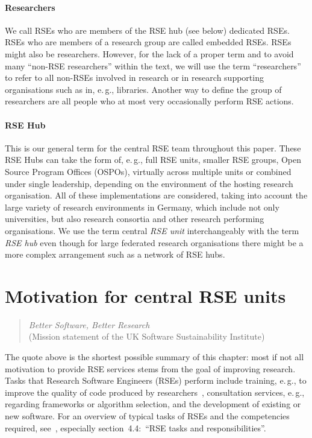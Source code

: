 \documentclass[10pt,letterpaper]{article}
\newcommand*{\eg}{e.\,g.,\xspace}
\begin{document}
\paragraph{Researchers}
We call RSEs who are members of the RSE hub (see below) dedicated RSEs.
RSEs who are members of a research group are called embedded RSEs.
RSEs might also be researchers.
However, for the lack of a proper term and to avoid many “non-RSE researchers” within the text, we will use the term “researchers” to refer to all non-RSEs involved in research or in research supporting organisations such as in, \eg{} libraries.
Another way to define the group of researchers are all people who at most very occasionally perform RSE actions.
\paragraph{RSE Hub}
This is our general term for the central RSE team throughout this paper.
These RSE Hubs can take the form of, \eg{} full RSE units, smaller RSE groups, Open Source Program Offices (OSPOs), virtually across multiple units or combined under single leadership, depending on the environment of the hosting research organisation.
All of these implementations are considered, taking into account the large variety of research environments in Germany, which include not only universities, but also research consortia and other research performing organisations.
We use the term central \emph{RSE unit} interchangeably with the term \emph{RSE hub} even though for large federated research organisations there might be a more complex arrangement such as a network of RSE hubs.

\section*{Motivation for central RSE units}
\label{sec:motivation}
\begin{quotation}
      \noindent \textit{Better Software, Better Research}\\(Mission statement of the UK Software Sustainability Institute)
\end{quotation}

The quote above is the shortest possible summary of this chapter: most if not all motivation to provide RSE services stems from the goal of improving research.
Tasks that Research Software Engineers (RSEs) perform include training, \eg{} to improve the quality of code produced by researchers~\cite{Ostlund2023}, consultation services, \eg{} regarding frameworks or algorithm selection, and the development of existing or new software.
For an overview of typical tasks of RSEs and the competencies required, see~\cite{goth_foundational_competencies_2024}, especially section\ 4.4:\ “RSE tasks and responsibilities”.
\end{document}

